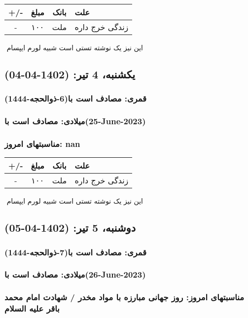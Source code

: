 \documentclass{article}
\newcommand{\rnote}[1]{\marginpar{\textcolor{color}{\StrSubstitute{\##1}{ }{\_}}}}
\newcommand{\myRow}[4]{
    #1 & #2 & #3 & #4 \\ \hline
}
\begin{document}
\begin{tabular}{ | c | c | c | p{5cm} |}
    \hline
    \myRow{ +/- }{مبلغ}{بانک}{علت}
    \myRow{-}{۱۰۰}{ملت}{زندگی خرج داره}
\end{tabular}
\newline
\newline

‌
\rnote{تست}
این نیز یک نوشته تستی است شبیه لورم ایپسام




\newpage
{}
\textcolor{color}{
\section{ یکشنبه، 4 تیر: (1402-04-04) }
\subsubsection*{قمری: مصادف است با(6-ذوالحجه-1444)} 
\subsubsection*{میلادی: مصادف است با(25-June-2023)}
\subsubsection*{مناسبتهای امروز: nan}
}


\begin{tabular}{ | c | c | c | p{5cm} |}
    \hline
    \myRow{ +/- }{مبلغ}{بانک}{علت}
    \myRow{-}{۱۰۰}{ملت}{زندگی خرج داره}
\end{tabular}
\newline
\newline

‌
\rnote{تست}
این نیز یک نوشته تستی است شبیه لورم ایپسام




\newpage
{}
\textcolor{color}{
\section{ دوشنبه، 5 تیر: (1402-04-05) }
\subsubsection*{قمری: مصادف است با(7-ذوالحجه-1444)} 
\subsubsection*{میلادی: مصادف است با(26-June-2023)}
\subsubsection*{مناسبتهای امروز: روز جهانی مبارزه با مواد مخدر / شهادت امام محمد باقر علیه السلام}
}
\end{document}
